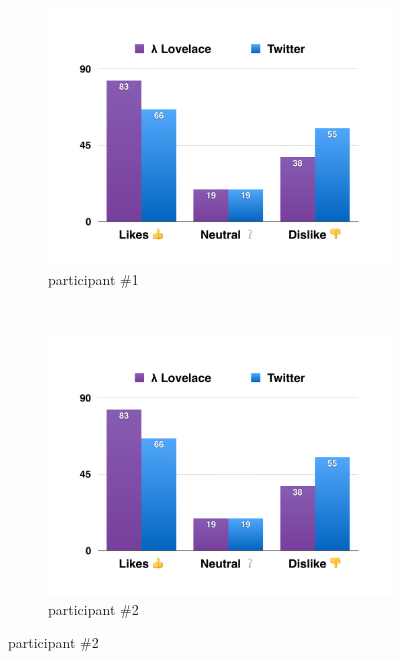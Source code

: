 \documentclass{article}
\begin{document}
\begin{figure}
    \centering
    \begin{subfigure}[b]{0.48\textwidth}
        \includegraphics[page=1,width=\textwidth]{evaluation_charts}
        \caption{participant \#1}
        \label{fig:participant1}
    \end{subfigure}
    ~ %
    \begin{subfigure}[b]{0.48\textwidth}
        \includegraphics[page=2,width=\textwidth]{evaluation_charts}
        \caption{participant \#2}
        \label{fig:participant2}
    \end{subfigure}
    

\end{figure}
\end{document}
